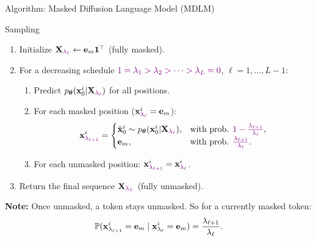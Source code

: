 \documentclass{beamer}
\begin{document}
\begin{frame}{Algorithm: Masked Diffusion Language Model (MDLM)}
	\begin{block}{Sampling}
		\begin{enumerate}
			\item Initialize $\mathbf{X}_{{\color{violet}\lambda_1}} \leftarrow \mathbf e_m \mathbf 1^\top$ (fully masked).
			\item For a decreasing schedule ${\color{violet}1 = \lambda_1 > \lambda_2 > \cdots > \lambda_L = 0}$, $\ell = 1, \ldots, L-1$:
			\begin{enumerate}
				\item Predict $p_{\boldsymbol{\theta}}(\mathbf{x}_0^i | \mathbf{X}_{{\color{violet}\lambda_\ell}})$ for all positions.
				\item For each masked position ($\mathbf{x}_{{\color{violet}\lambda_\ell}}^i = \mathbf e_m$):
				\vspace{-0.3cm}
				\[
					\mathbf{x}_{{\color{violet}\lambda_{\ell+1}}}^i =
					\begin{cases}
						\hat{\mathbf{x}}_0^i \sim p_{\boldsymbol{\theta}}(\mathbf{x}_0^i | \mathbf{X}_{{\color{violet}\lambda_\ell}}), & \text{with prob. } {\color{violet}1 - \tfrac{\lambda_{\ell+1}}{\lambda_\ell}},\\
						\mathbf e_m, & \text{with prob. } {\color{violet}\tfrac{\lambda_{\ell+1}}{\lambda_\ell}}.
					\end{cases}
				\]
				\vspace{-0.5cm}
				\item For each unmasked position: $\mathbf{x}_{{\color{violet}\lambda_{\ell+1}}}^i = \mathbf{x}_{{\color{violet}\lambda_\ell}}^i$.
			\end{enumerate}
			\item Return the final sequence $\mathbf{X}_{{\color{violet}\lambda_L}}$ (fully unmasked).
		\end{enumerate}
	\end{block}
	\textbf{Note:} Once unmasked, a token stays unmasked. So for a currently masked token:
	\[
		\mathbb{P}(\mathbf{x}_{\lambda_{\ell+1}} ^i = \mathbf{e}_m \mid \mathbf{x}_{\lambda_\ell}^i = \mathbf{e}_m)
		= \frac{\lambda_{\ell+1}}{\lambda_\ell}.
	\]
\end{frame}
\end{document}
